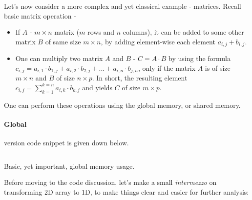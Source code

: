 \documentclass[12pt]{article}
\begin{document}
Let's now consider a more complex and yet classical example - matrices. Recall basic matrix operation - 
\begin{itemize}
   \setlength\itemsep{-0.5em}
   \item If $A$ - $m\times n$ matrix ($m$ rows and $n$ columns), it can be added to some 
   other matrix $B$ of same size $m\times n$, by adding element-wise each element $a_{i,j}+b_{i,j}$. 
   \item One can multiply two matrix $A$ and $B$ - $C = A\cdot B$ by using the formula 
   $c_{i,j} = a_{i,1}\cdot b_{1,j} + a_{i,2}\cdot b_{2,j} + ... + a_{i, n}\cdot b_{j,n}$, only if the matrix 
   $A$ is of size $m\times n$ and $B$ of size $n\times p$. In short, the resulting 
   element $c_{i,j} = \sum_{k=1}^{k=n}a_{i,k}\cdot b_{k,j}$ and yields $C$ of size $m\times p$.
\end{itemize}

One can perform these operations using the global memory, or shared memory.

\paragraph{Global} version code snippet is given down below.
\begin{listing}
\inputminted[linenos=true, frame=single]{cuda}{cucodes/matmulglob.cu}
    \caption{Basic, yet important, global memory usage. \cite{tuomanen2018hands}}
\end{listing}

Before moving to the code discussion, let's make a small \textit{intermezzo}
on transforming 2D array to 1D, to make things clear and easier for further analysis:
\end{document}
